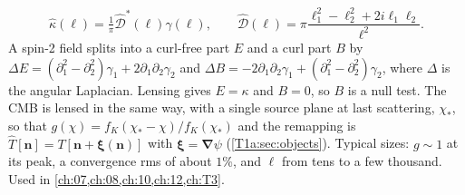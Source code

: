 \begin{equation*}
\hat\kappa(\bm\ell)=\tfrac1\pi\hat{\mathcal D}^*(\bm\ell)\hat\gamma(\bm\ell),\qquad
\hat{\mathcal D}(\bm\ell)=\pi\frac{\ell_1^2-\ell_2^2+2i\ell_1\ell_2}{\ell^2}.
\end{equation*}
A spin-2 field splits into a curl-free part $E$ and a curl part $B$ by $\Delta E=(\partial_1^2-\partial_2^2)\gamma_1+2\partial_1\partial_2\gamma_2$ and $\Delta B=-2\partial_1\partial_2\gamma_1+(\partial_1^2-\partial_2^2)\gamma_2$, where $\Delta$ is the angular Laplacian. Lensing gives $E=\kappa$ and $B=0$, so $B$ is a null test. The CMB is lensed in the same way, with a single source plane at last scattering, $\chi_*$, so that $g(\chi)=f_K(\chi_*-\chi)/f_K(\chi_*)$ and the remapping is $\hat T[\bm n]=T[\bm n+\bm\xi(\bm n)]$ with $\bm\xi=\bm\nabla\psi$ (\cref{T1a:sec:objects}). Typical sizes: $g\sim1$ at its peak, a convergence rms of about $1\%$, and $\ell$ from tens to a few thousand. Used in \cref{ch:07,ch:08,ch:10,ch:12,ch:T3}.

